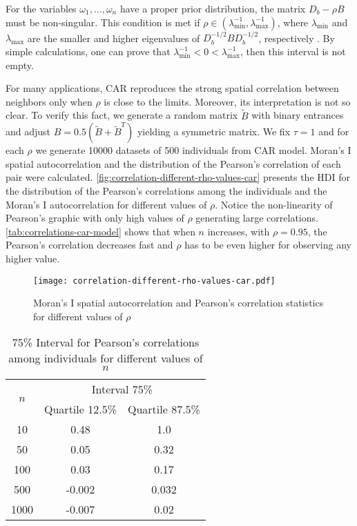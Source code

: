 For the variables $\omega_1, \dots, \omega_n$ have a proper prior
distribution, the matrix $D_{b} - \rho B$ must be non-singular. This
condition is met if $\rho \in (\lambda_{\min}^{-1}, \lambda_{\max}^{-1})$, where
$\lambda_{\min}$ and $\lambda_{\max}$ are the smaller and higher eigenvalues of
$D_{b}^{-1/2}BD_{b}^{-1/2}$, respectively \cite[p.
94]{banerjee2003hierarchical}. By simple calculations, one can prove that $\lambda_{\min}^{-1} < 0 <
\lambda_{\max}^{-1}$, then this interval is not empty. 

For many applications, CAR reproduces the strong spatial correlation between 
neighbors only when $\rho$ is close to the limits. Moreover, its
interpretation is not so clear. To verify this fact, we generate a random
matrix $\tilde{B}$ with binary entrances and adjust $B =
0.5(\tilde{B} + \tilde{B}^T)$ yielding a symmetric matrix. We fix $\tau =
1$ and for each $\rho$ we generate 10000 datasets of 500 individuals from CAR
model. Moran's I spatial autocorrelation and the distribution of the Pearson's
correlation of each pair were calculated.
\autoref{fig:correlation-different-rho-values-car} presents the HDI for the
distribution of the Pearson's correlations among the individuals and the
Moran's I autocorrelation for different values of $\rho$. Notice the
non-linearity of Pearson's graphic with only high values of $\rho$ generating
large correlations. \autoref{tab:correlations-car-model} shows that when $n$
increases, with $\rho=0.95$, the Pearson's correlation decreases fast and
$\rho$ has to be even higher for observing any higher value. 

\begin{figure}[htbp]
  \centering
  \caption{\label{fig:correlation-different-rho-values-car}Moran's I spatial
  autocorrelation and Pearson's correlation statistics for different values of
  $\rho$}
  \texttt{[image: correlation-different-rho-values-car.pdf]}
\end{figure}

\begin{table}[htbp]
  \centering
  \caption{\label{tab:correlations-car-model}75\% Interval for Pearson's correlations among
  individuals for different values of $n$}
  \begin{tabular}{ccc}
  \hline
  \multirow{2}{*}{$n$} & \multicolumn{2}{c}{Interval 75\%} \\ \cline{2-3} 
   & Quartile 12.5\% & Quartile 87.5\% \\ \hline
  10 & 0.48 & 1.0 \\
  50 & 0.05 & 0.32 \\
  100 & 0.03 & 0.17 \\
  500 & -0.002 & 0.032 \\
  1000 & -0.007 & 0.02 \\ \hline
  \end{tabular}
\end{table}

